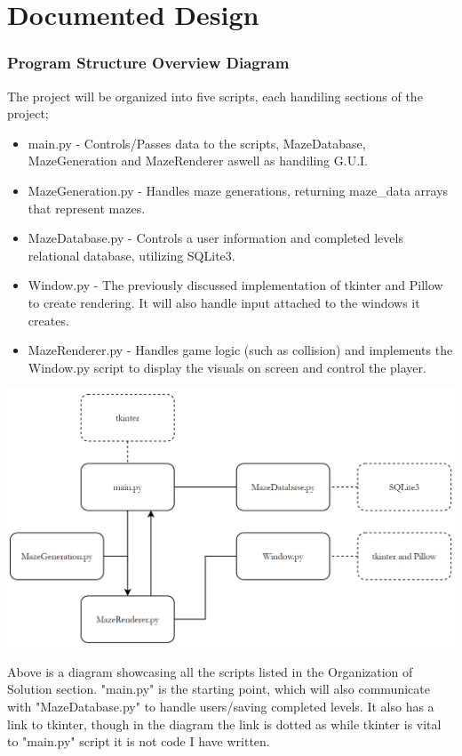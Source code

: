 \documentclass{article}
\begin{document}
\clearpage
\part{Documented Design}
\section{Program Structure Overview Diagram}
The project will be organized into five scripts, each handiling sections of the project;
\begin{itemize}
\item main.py - Controls/Passes data to the scripts, MazeDatabase, MazeGeneration and MazeRenderer aswell as handiling G.U.I.
\item MazeGeneration.py - Handles maze generations, returning maze\_data arrays that represent mazes.
\item MazeDatabase.py - Controls a user information and completed levels relational database, utilizing SQLite3.
\item Window.py - The previously discussed implementation of tkinter and Pillow to create rendering. It will also handle input attached to the windows it creates.
\item MazeRenderer.py - Handles game logic (such as collision) and implements the Window.py script to display the visuals on screen and control the player.
\end{itemize}
\begin{center}
	\includegraphics[scale=0.5]{Code Organization Diagram}
\end{center}
Above is a diagram showcasing all the scripts listed in the Organization of Solution section. "main.py" is the starting point, which will also communicate with "MazeDatabase.py"
to handle users/saving completed levels. It also has a link to tkinter, though in the diagram the link is dotted as while tkinter is vital to "main.py" script it is not code I have written.
\end{document}
